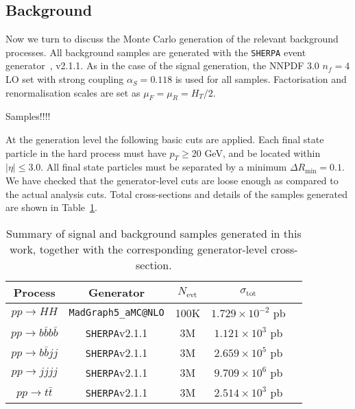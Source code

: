 \subsection{Background}

Now we turn to discuss the Monte Carlo generation of the relevant background processes.
%
All background samples are generated with the {\tt SHERPA} event generator~\cite{Gleisberg:2008ta}, v2.1.1.
%
As in the case of the signal generation, the NNPDF 3.0 $n_f = 4$ LO set with strong coupling $\alpha_S=0.118$ is used for all samples.
Factorisation and renormalisation scales are set as $\mu_F=\mu_R=H_T/2$.

Samples!!!!

At the generation level the following basic cuts are applied.
%
Each final state particle in the hard process must have $p_T \ge 20$ GeV, and be located within $| \eta | \le 3.0$. All final state particles must be separated by a minimum $\Delta R_{\mathrm{min}} =0.1$.
%
We have checked that the generator-level cuts are loose enough as compared to the actual
analysis cuts.
%
Total cross-sections and details of the samples generated are shown in Table~\ref{tab:samples}. 


\begin{table}[h]
\begin{center}
\begin{tabular}{|c|c|c|c|c|}
\hline
Process &  Generator & $N_{\mathrm{evt}}$ & $\sigma_{\mathrm{tot}}$ \\
\hline
\hline
$pp \to HH$ &  {\tt MadGraph5\_aMC@NLO} & 100K & $1.729\times10^{-2}$ pb \\
\hline
\hline
$pp \to b\bar{b}b\bar{b}$ &  {\tt SHERPA}v2.1.1 & 3M &$1.121 \times10^3$ pb \\
$pp \to b\bar{b}jj$ &  {\tt SHERPA}v2.1.1 & 3M & $2.659 \times 10^5$ pb \\
$pp \to jjjj$ &  {\tt SHERPA}v2.1.1 & 3M  & $9.709\times 10^6$ pb \\
$pp \to t\bar{t}$ &  {\tt SHERPA}v2.1.1 & 3M & $2.514\times 10^3$ pb \\
\hline
\end{tabular}
\caption{\small Summary of signal and background samples generated in this work,
together with the corresponding generator-level cross-section.} \label{tab:samples}
\end{center}
\end{table}%


